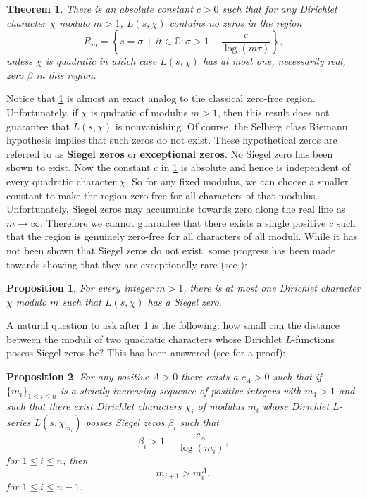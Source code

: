 \documentclass[12pt]{book}
\newtheorem{theorem}{Theorem}[section]
\newtheorem{proposition}{Proposition}[section]
\theoremstyle{definition}\newframedtheorem{method}{Method}
\newcommand{\C}{\mathbb{C}}
\renewcommand{\b}{\beta}
\newcommand{\s}{\sigma}
\newcommand{\<}{\langle}
\renewcommand{\>}{\rangle}
\begin{document}
    \begin{theorem}\label{thm:zero_free_region_Dirichlet_L-functions}
      There is an absolute constant $c > 0$ such that for any Dirichlet character $\chi$ modulo $m > 1$, $L(s,\chi)$ contains no zeros in the region
      \[
        R_{m} = \left\{s = \s+it \in \C:\s > 1-\frac{c}{\log(m\tau)}\right\},
      \]
      unless $\chi$ is quadratic in which case $L(s,\chi)$ has at most one, necessarily real, zero $\b$ in this region.
    \end{theorem}

    Notice that \cref{thm:zero_free_region_Dirichlet_L-functions} is almost an exact analog to the classical zero-free region. Unfortunately, if $\chi$ is qudratic of modulus $m > 1$, then this result does not guarantee that $L(s,\chi)$ is nonvanishing. Of course, the Selberg class Riemann hypothesis implies that such zeros do not exist. These hypothetical zeros are referred to as \textbf{Siegel zeros} or \textbf{exceptional zeros}. No Siegel zero has been shown to exist. Now the constant $c$ in \cref{thm:zero_free_region_Dirichlet_L-functions} is absolute and hence is independent of every quadratic character $\chi$. So for any fixed modulus, we can choose a smaller constant to make the region zero-free for all characters of that modulus. Unfortunately, Siegel zeros may accumulate towards zero along the real line as $m \to \infty$. Therefore we cannot guarantee that there exists a single positive $c$ such that the region is genuinely zero-free for all characters of all moduli. While it has not been shown that Siegel zeros do not exist, some progress has been made towards showing that they are exceptionally rare (see \cite{montgomery2007multiplicative}):

    \begin{proposition}\label{prop:at_most_one_Siegel_zero_per_modulus}
      For every integer $m > 1$, there is at most one Dirichlet character $\chi$ modulo $m$ such that $L(s,\chi)$ has a Siegel zero.
    \end{proposition}

    A natural question to ask after \cref{prop:at_most_one_Siegel_zero_per_modulus} is the following: how small can the distance between the moduli of two quadratic characters whose Dirichlet $L$-functions posess Siegel zeros be? This has been answered (see \cite{montgomery2007multiplicative} for a proof):

    \begin{proposition}\label{prop:modulus_distance_Siegel_zeros}
      For any positive $A > 0$ there exists a $c_{A} > 0$ such that if $\{m_{i}\}_{1 \le i \le n}$ is a strictly increasing sequence of positive integers with $m_{1} > 1$ and such that there exist Dirichlet characters $\chi_{i}$ of modulus $m_{i}$ whose Dirichlet $L$-series $L(s,\chi_{m_{i}})$ posses Siegel zeros $\b_{i}$ such that
      \[
        \b_{i} > 1-\frac{c_{A}}{\log(m_{i})},
      \]
      for $1 \le i \le n$, then
      \[
        m_{i+1} > m_{i}^{A},
      \]
      for $1 \le i \le n-1$.
    \end{proposition}
\end{document}
